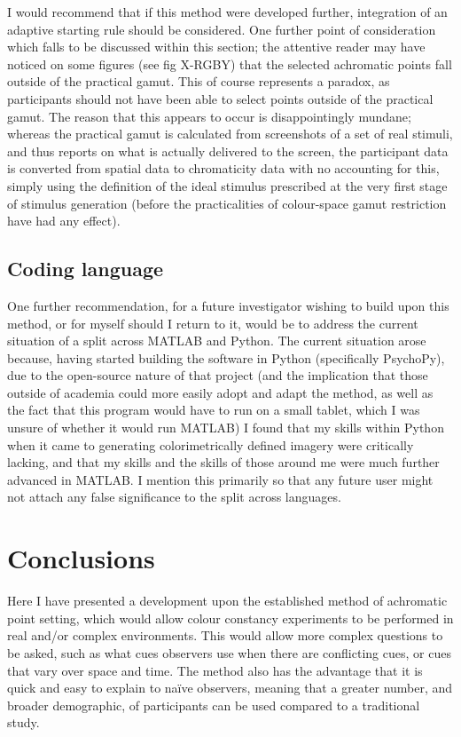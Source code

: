I would recommend that if this method were developed further, integration of an adaptive starting rule should be considered.
One further point of consideration which falls to be discussed within this section; the attentive reader may have noticed on some figures (see fig X-RGBY) that the selected achromatic points fall outside of the practical gamut. This of course represents a paradox, as participants should not have been able to select points outside of the practical gamut. The reason that this appears to occur is disappointingly mundane; whereas the practical gamut is calculated from screenshots of a set of real stimuli, and thus reports on what is actually delivered to the screen, the participant data is converted from spatial data to chromaticity data with no accounting for this, simply using the definition of the ideal stimulus prescribed at the very first stage of stimulus generation (before the practicalities of colour-space gamut restriction have had any effect).

\subsection{Coding language}

One further recommendation, for a future investigator wishing to build upon this method, or for myself should I return to it, would be to address the current situation of a split across MATLAB and Python. The current situation arose because, having started building the software in Python (specifically PsychoPy), due to the open-source nature of that project (and the implication that those outside of academia could more easily adopt and adapt the method, as well as the fact that this program would have to run on a small tablet, which I was unsure of whether it would run MATLAB) I found that my skills within Python when it came to generating colorimetrically defined imagery were critically lacking, and that my skills and the skills of those around me were much further advanced in MATLAB. I mention this primarily so that any future user might not attach any false significance to the split across languages.

\section{Conclusions}

Here I have presented a development upon the established method of achromatic point setting, which would allow colour constancy experiments to be performed in real and/or complex environments. This would allow more complex questions to be asked, such as what cues observers use when there are conflicting cues, or cues that vary over space and time.
The method also has the advantage that it is quick and easy to explain to naïve observers, meaning that a greater number, and broader demographic, of participants can be used compared to a traditional study.

